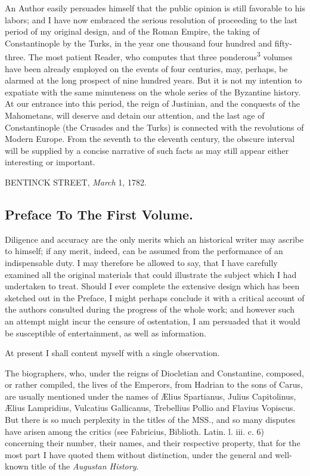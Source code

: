 An Author easily persuades himself that the public opinion is still favorable
to his labors; and I have now embraced the serious resolution of proceeding
to the last period of my original design, and of the Roman Empire, the taking
of Constantinople by the Turks, in the year one thousand four hundred and
fifty-three. The most patient Reader, who computes that three
ponderous\textsuperscript{3} volumes have been already employed on the events
of four centuries, may, perhaps, be alarmed at the long prospect of nine hundred
years. But it is not my intention to expatiate with the same minuteness on the
whole series of the Byzantine history. At our entrance into this period, the
reign of Justinian, and the conquests of the Mahometans, will deserve and
detain our attention, and the last age of Constantinople (the Crusades and
the Turks) is connected with the revolutions of Modern Europe. From the
seventh to the eleventh century, the obscure interval will be supplied by a
concise narrative of such facts as may still appear either interesting or important.

BENTINCK STREET, \textit{March} 1, 1782.



\subsection{Preface To The First Volume.}


Diligence and accuracy are the only merits which an historical writer may
ascribe to himself; if any merit, indeed, can be assumed from the performance
of an indispensable duty. I may therefore be allowed to say, that I have
carefully examined all the original materials that could illustrate the
subject which I had undertaken to treat. Should I ever complete the extensive
design which has been sketched out in the Preface, I might perhaps conclude
it with a critical account of the authors consulted during the progress of
the whole work; and however such an attempt might incur the censure of
ostentation, I am persuaded that it would be susceptible of entertainment, as
well as information.

At present I shall content myself with a single observation.

The biographers, who, under the reigns of Diocletian and Constantine, composed,
or rather compiled, the lives of the Emperors, from Hadrian to the sons of
Carus, are usually mentioned under the names of Ælius Spartianus, Julius
Capitolinus, Ælius Lampridius, Vulcatius Gallicanus, Trebellius Pollio and
Flavius Vopiscus. But there is so much perplexity in the titles of the MSS.,
and so many disputes have arisen among the critics (see Fabricius, Biblioth.
Latin. l. iii. c. 6) concerning their number, their names, and their respective
property, that for the most part I have quoted them without distinction, under
the general and well-known title of the \textit{Augustan History}.


